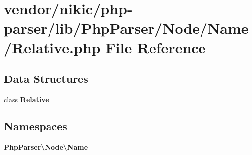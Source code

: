 \section{vendor/nikic/php-\/parser/lib/\+Php\+Parser/\+Node/\+Name/\+Relative.php File Reference}
\label{_relative_8php}
\subsection*{Data Structures}
\begin{DoxyCompactItemize}
\item 
class {\bf Relative}
\end{DoxyCompactItemize}
\subsection*{Namespaces}
\begin{DoxyCompactItemize}
\item 
 {\bf Php\+Parser\textbackslash{}\+Node\textbackslash{}\+Name}
\end{DoxyCompactItemize}
